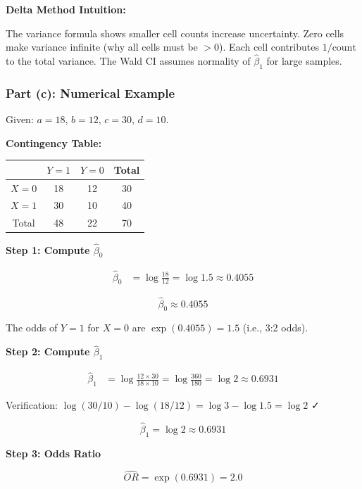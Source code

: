 \begin{explanation}
\textbf{Delta Method Intuition:}

The variance formula shows smaller cell counts increase uncertainty. Zero cells make variance infinite (why all cells must be $>0$). Each cell contributes $1/\text{count}$ to the total variance. The Wald CI assumes normality of $\hat{\beta}_1$ for large samples.
\end{explanation}

\subsubsection{Part (c): Numerical Example}

\begin{solution}
Given: $a = 18$, $b = 12$, $c = 30$, $d = 10$.

\textbf{Contingency Table:}

\begin{center}
\begin{tabular}{c|cc|c}
& $Y=1$ & $Y=0$ & Total \\
\hline
$X=0$ & 18 & 12 & 30 \\
$X=1$ & 30 & 10 & 40 \\
\hline
Total & 48 & 22 & 70
\end{tabular}
\end{center}

\textbf{Step 1: Compute $\hat{\beta}_0$}

\begin{align*}
\hat{\beta}_0 &= \log\frac{18}{12} = \log 1.5 \approx 0.4055
\end{align*}

\[
\boxed{\hat{\beta}_0 \approx 0.4055}
\]

The odds of $Y=1$ for $X=0$ are $\exp(0.4055) = 1.5$ (i.e., 3:2 odds).

\textbf{Step 2: Compute $\hat{\beta}_1$}

\begin{align*}
\hat{\beta}_1 &= \log\frac{12 \times 30}{18 \times 10} = \log\frac{360}{180} = \log 2 \approx 0.6931
\end{align*}

Verification: $\log(30/10) - \log(18/12) = \log 3 - \log 1.5 = \log 2$ ✓

\[
\boxed{\hat{\beta}_1 = \log 2 \approx 0.6931}
\]

\textbf{Step 3: Odds Ratio}

\[
\widehat{OR} = \exp(0.6931) = 2.0
\]


\end{solution}
